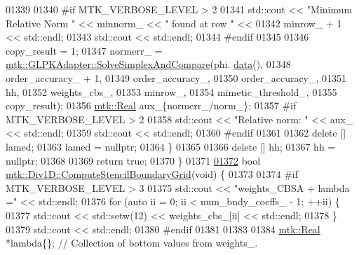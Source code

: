 \begin{DoxyCode}
{{01339 
01340 \textcolor{preprocessor}{    #if MTK\_VERBOSE\_LEVEL > 2}
01341     std::cout << \textcolor{stringliteral}{"Minimum Relative Norm "} << minnorm\_ << \textcolor{stringliteral}{" found at row "} <<
01342       minrow\_ + 1 << std::endl;
01343     std::cout << std::endl;
01344 \textcolor{preprocessor}{    #endif}
01345 
01346     copy\_result = 1;
01347     normerr\_ = \hyperlink{classmtk_1_1GLPKAdapter_a0c9ebb125445bc5af752bf4fb47f44b2}{mtk::GLPKAdapter::SolveSimplexAndCompare}(phi.
      \hyperlink{classmtk_1_1DenseMatrix_a0c33b8a9e01d157c61ddbdf807c25d84}{data}(),
01348                                                         order\_accuracy\_ + 1,
01349                                                         order\_accuracy\_,
01350                                                         order\_accuracy\_,
01351                                                         hh,
01352                                                         weights\_cbs\_,
01353                                                         minrow\_,
01354                                                         mimetic\_threshold\_,
01355                                                         copy\_result);
01356     \hyperlink{group__c01-roots_gac080bbbf5cbb5502c9f00405f894857d}{mtk::Real} aux\_\{normerr\_/norm\_\};
01357 \textcolor{preprocessor}{    #if MTK\_VERBOSE\_LEVEL > 2}
01358     std::cout << \textcolor{stringliteral}{"Relative norm: "} << aux\_ << std::endl;
01359     std::cout << std::endl;
01360 \textcolor{preprocessor}{    #endif}
01361 
01362     \textcolor{keyword}{delete} [] lamed;
01363     lamed = \textcolor{keyword}{nullptr};
01364   \}
01365 
01366   \textcolor{keyword}{delete} [] hh;
01367   hh = \textcolor{keyword}{nullptr};
01368 
01369   \textcolor{keywordflow}{return} \textcolor{keyword}{true};
01370 \}
01371 
\hypertarget{mtk__div__1d_8cc_source_l01372}{}\hyperlink{classmtk_1_1Div1D_a29bb417c76286414dce9258a0bcb5aab}{01372} \textcolor{keywordtype}{bool} \hyperlink{classmtk_1_1Div1D_a29bb417c76286414dce9258a0bcb5aab}{mtk::Div1D::ComputeStencilBoundaryGrid}(\textcolor{keywordtype}{void}) \{
01373 
01374 \textcolor{preprocessor}{  #if MTK\_VERBOSE\_LEVEL > 3}
01375   std::cout << \textcolor{stringliteral}{"weights\_CBSA + lambda ="} << std::endl;
01376   \textcolor{keywordflow}{for} (\textcolor{keyword}{auto} ii = 0; ii < num\_bndy\_coeffs\_ - 1; ++ii) \{
01377     std::cout << std::setw(12) << weights\_cbs\_[ii] << std::endl;
01378   \}
01379   std::cout << std::endl;
01380 \textcolor{preprocessor}{  #endif}
01381 
01383 
01384   \hyperlink{group__c01-roots_gac080bbbf5cbb5502c9f00405f894857d}{mtk::Real} *lambda\{\}; \textcolor{comment}{// Collection of bottom values from weights\_.}
}}
\end{DoxyCode}
